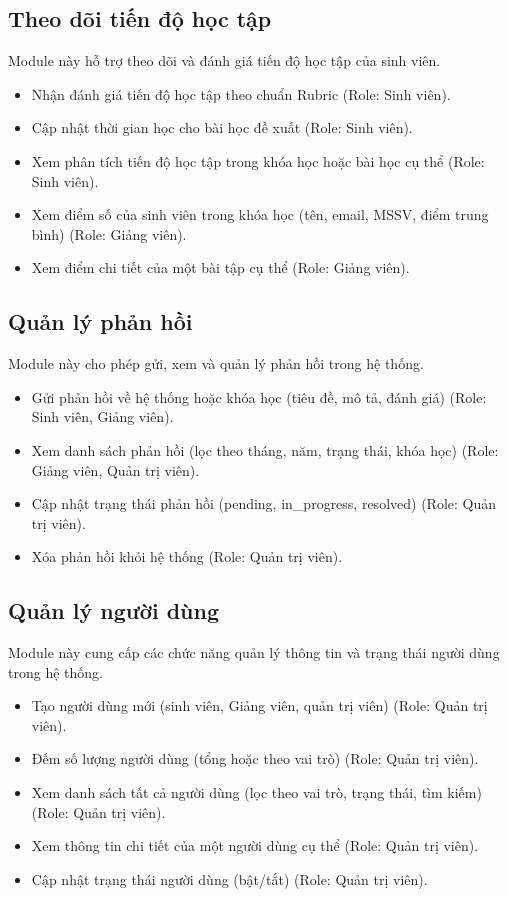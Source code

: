 \subsection{Theo dõi tiến độ học tập}
Module này hỗ trợ theo dõi và đánh giá tiến độ học tập của sinh viên.
\begin{itemize}[label=--]
    \item Nhận đánh giá tiến độ học tập theo chuẩn Rubric (Role: Sinh viên).
    \item Cập nhật thời gian học cho bài học đề xuất (Role: Sinh viên).
    \item Xem phân tích tiến độ học tập trong khóa học hoặc bài học cụ thể (Role: Sinh viên).
    \item Xem điểm số của sinh viên trong khóa học (tên, email, MSSV, điểm trung bình) (Role: Giảng viên).
    \item Xem điểm chi tiết của một bài tập cụ thể (Role: Giảng viên).
\end{itemize}

\subsection{Quản lý phản hồi}
Module này cho phép gửi, xem và quản lý phản hồi trong hệ thống.
\begin{itemize}[label=--]
    \item Gửi phản hồi về hệ thống hoặc khóa học (tiêu đề, mô tả, đánh giá) (Role: Sinh viên, Giảng viên).
    \item Xem danh sách phản hồi (lọc theo tháng, năm, trạng thái, khóa học) (Role: Giảng viên, Quản trị viên).
    \item Cập nhật trạng thái phản hồi (pending, in\_progress, resolved) (Role: Quản trị viên).
    \item Xóa phản hồi khỏi hệ thống (Role: Quản trị viên).
\end{itemize}

\subsection{Quản lý người dùng}
Module này cung cấp các chức năng quản lý thông tin và trạng thái người dùng trong hệ thống.
\begin{itemize}[label=--]
    \item Tạo người dùng mới (sinh viên, Giảng viên, quản trị viên) (Role: Quản trị viên).
    \item Đếm số lượng người dùng (tổng hoặc theo vai trò) (Role: Quản trị viên).
    \item Xem danh sách tất cả người dùng (lọc theo vai trò, trạng thái, tìm kiếm) (Role: Quản trị viên).
    \item Xem thông tin chi tiết của một người dùng cụ thể (Role: Quản trị viên).
    \item Cập nhật trạng thái người dùng (bật/tắt) (Role: Quản trị viên).
\end{itemize}


